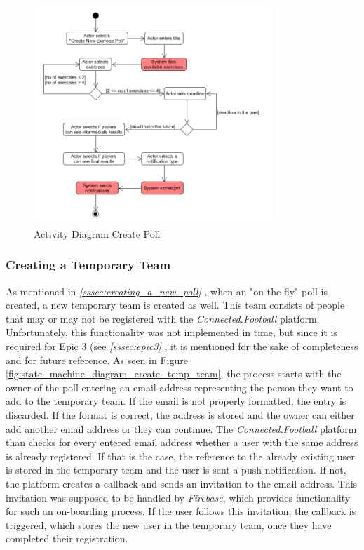 \begin{figure}[H] 
    \begin{center}
        \includegraphics[width=0.8\textwidth]{images/diagrams/activity_diagrams/ActivityDiagram_CreateExercisePoll.png}
        \caption{Activity Diagram Create Poll}
        \label{fig:activity_diagram_create_poll}
    \end{center}
\end{figure}

\subsubsection{Creating a Temporary Team}
\label{sssec:creating_temp_team}

As mentioned in \textit{\ref{sssec:creating_a_new_poll} }, when an "on-the-fly" poll is created, a new temporary team is created as well. This team consists of people that may or may not be registered with the \textit{Connected.Football} platform. Unfortunately, this functionality was not implemented in time, but since it is required for Epic 3 (see \textit{\ref{sssec:epic3} }, it is mentioned for the sake of completeness and for future reference.
\newline
As seen in Figure \ref{fig:state_machine_diagram_create_temp_team}, the process starts with the owner of the poll entering an email address representing the person they want to add to the temporary team. If the email is not properly formatted, the entry is discarded. If the format is correct, the address is stored and the owner can either add another email address or they can continue.
\newline
The \textit{Connected.Football} platform than checks for every entered email address whether a user with the same address is already registered. If that is the case, the reference to the already existing user is stored in the temporary team and the user is sent a push notification. If not, the platform creates a callback and sends an invitation to the email address. This invitation was supposed to be handled by \textit{Firebase}, which provides functionality for such an on-boarding process. If the user follows this invitation, the callback is triggered, which stores the new user in the temporary team, once they have completed their registration.

